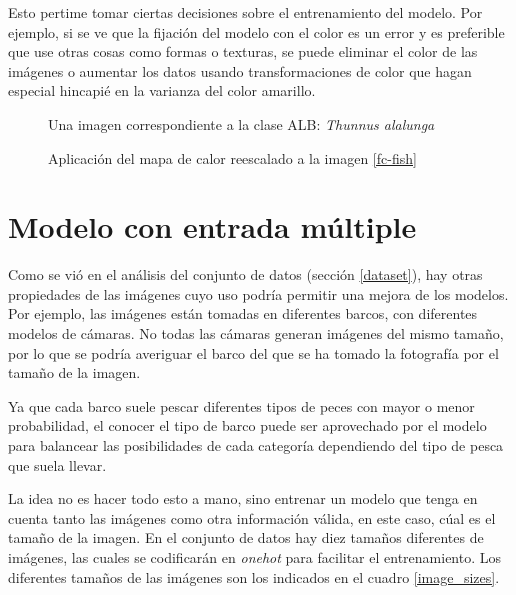 Esto pertime tomar ciertas decisiones sobre el entrenamiento del modelo. Por ejemplo, si se ve que la fijación del modelo con el color es un error y es preferible que use otras cosas como formas o texturas, se puede eliminar el color de las imágenes o aumentar los datos usando transformaciones de color que hagan especial hincapié en la varianza del color amarillo.

\begin{figure}
    \caption{Una imagen correspondiente a la clase ALB: \textit{Thunnus alalunga}}
\label{yft}
\end{figure}

\begin{figure}
    \caption{Aplicación del mapa de calor reescalado a la imagen \ref{fc-fish}}
\label{yft-heatmap}
\end{figure}

\section{Modelo con entrada múltiple}
\label{sec:multi_entry}

Como se vió en el análisis del conjunto de datos (sección \ref{dataset}), hay otras propiedades de las imágenes cuyo uso podría permitir una mejora de los modelos. Por ejemplo, las imágenes están tomadas en diferentes barcos, con diferentes modelos de cámaras. No todas las cámaras generan imágenes del mismo tamaño, por lo que se podría averiguar el barco del que se ha tomado la fotografía por el tamaño de la imagen.

Ya que cada barco suele pescar diferentes tipos de peces con mayor o menor probabilidad, el conocer el tipo de barco puede ser aprovechado por el modelo para balancear las posibilidades de cada categoría dependiendo del tipo de pesca que suela llevar.

La idea no es hacer todo esto a mano, sino entrenar un modelo que tenga en
cuenta tanto las imágenes como otra información válida, en este caso, cúal es
el tamaño de la imagen. En el conjunto de datos hay diez tamaños diferentes de
imágenes, las cuales se codificarán en \textit{onehot} para facilitar el
entrenamiento.  Los diferentes tamaños de las imágenes son los indicados en el
cuadro \ref{image_sizes}.

